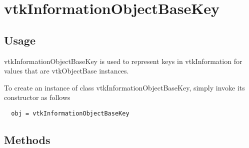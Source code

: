 \section{vtkInformationObjectBaseKey}

\subsection{Usage}

 vtkInformationObjectBaseKey is used to represent keys in
 vtkInformation for values that are vtkObjectBase instances.

To create an instance of class vtkInformationObjectBaseKey, simply
invoke its constructor as follows
\begin{verbatim}
  obj = vtkInformationObjectBaseKey
\end{verbatim}
\subsection{Methods}

